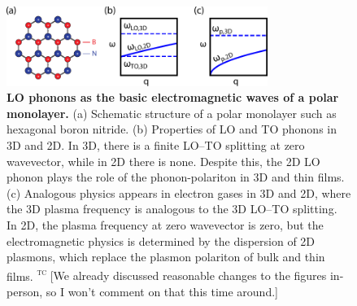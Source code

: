 \documentclass[aps,prb,twocolumn,
	           groupedaddress,superscriptaddress,
               amsfonts,amssymb,amsmath,floatfix,
	           citeautoscript]{revtex4-1}
\newcommand{\comment}[2]{%
    \ifbool{togglecomments}%
    {\textcolor{blue!70!black}{\small\textsf{%
    \textsuperscript{\textsc{\textsf{\MakeLowercase{#1}}}}%
    [#2]}}} %
    {}}     %
\begin{document}
\begin{figure}[t]
    \includegraphics[width=85mm]{fig1.pdf}
    \caption{%
        \textbf{LO phonons as the basic electromagnetic waves of a polar monolayer.} (a) Schematic structure of a polar monolayer such as hexagonal boron nitride. (b) Properties of LO and TO phonons in 3D and 2D. In 3D, there is a finite LO--TO splitting at zero wavevector, while in 2D there is none. Despite this, the 2D LO phonon plays the role of the phonon-polariton in 3D and thin films. (c) Analogous physics appears in electron gases in 3D and 2D, where the 3D plasma frequency is analogous to the 3D LO--TO splitting. In 2D, the plasma frequency at zero wavevector is zero, but the electromagnetic physics is determined by the dispersion of 2D plasmons, which replace the plasmon polariton of bulk and thin films.
        \comment{tc}{We already discussed reasonable changes to the figures in-person, so I won't comment on that this time around.}
        \label{fig:1}
        }
\end{figure}~




\end{document}
